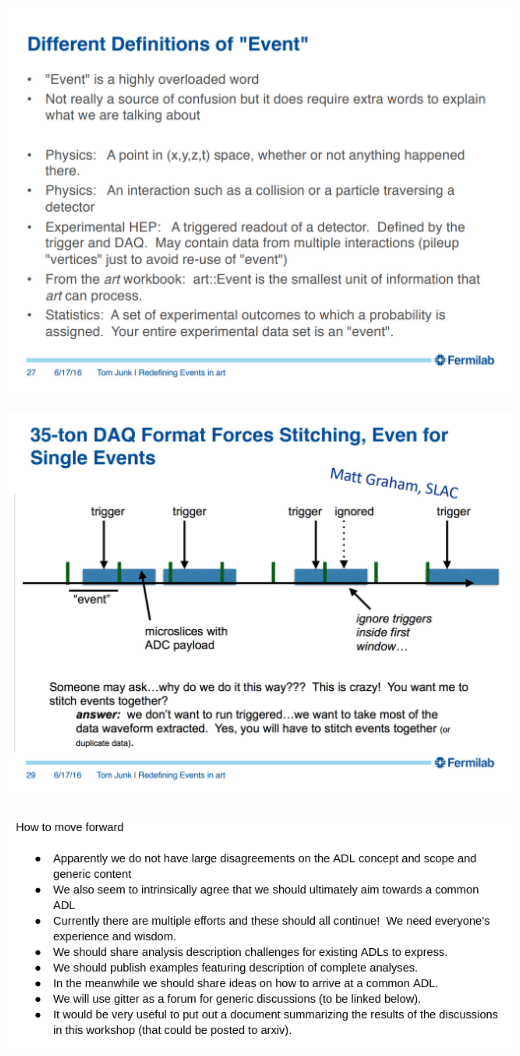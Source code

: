\documentclass[aspectratio=169]{beamer}
\begin{document}
\begin{frame}{}
\vspace{-0.5 cm}
\begin{center}
\includegraphics[height=9.3 cm]{slides-22.png}
\end{center}
\end{frame}

\begin{frame}{}
\vspace{-0.5 cm}
\begin{center}
\includegraphics[height=9.3 cm]{slides-23.png}
\end{center}
\end{frame}

\begin{frame}{}
\begin{center}
\includegraphics[width=\linewidth]{slides-24.png}
\end{center}
\end{frame}
\end{document}
